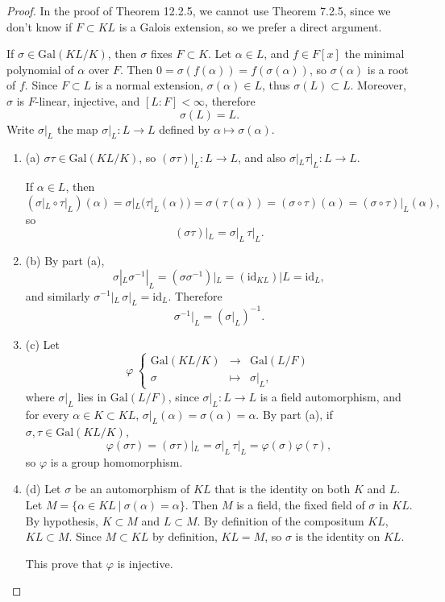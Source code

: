 \documentclass[11pt,a4paper]{article}
\newcommand{\be} {\begin{enumerate}}
\newcommand{\ee} {\end{enumerate}}
\newcommand{\Gal}{\mathrm{Gal}}
\begin{document}
\begin{proof}
In the proof of Theorem 12.2.5, we cannot use Theorem 7.2.5, since we don't know if $F \subset KL$ is a Galois extension, so we prefer a direct argument. 

If $\sigma \in \Gal(KL/K)$, then $\sigma$ fixes $F \subset K$. Let $\alpha \in L$, and $f \in F[x]$ the minimal polynomial of $\alpha$ over $F$. Then $0 = \sigma(f(\alpha)) = f(\sigma(\alpha))$, so $\sigma(\alpha)$ is a root of $f$. Since $F \subset L$ is a normal extension, $\sigma(\alpha) \in L$, thus $\sigma(L) \subset L$. Moreover, $\sigma$ is $F$-linear, injective, and $[L:F] < \infty$, therefore $$\sigma(L) = L.$$
Write $\sigma|_L $ the map $\sigma|_L : L \to L$ defined by $ \alpha \mapsto \sigma(\alpha)$.

\be
\item[(a)] $\sigma \tau \in \Gal(KL/K)$, so $(\sigma \tau)|_L : L \to L$, and also $\sigma|_L \tau|_L : L \to L$.

If $\alpha \in L$, then 
$$(\sigma|_L \circ \tau|_L)(\alpha) = \sigma|_L(\tau|_L(\alpha)) = \sigma(\tau(\alpha)) = (\sigma \circ \tau)(\alpha) =  (\sigma \circ \tau)|_L(\alpha),$$
so $$(\sigma \tau)|_L = \sigma|_L\, \tau|_L.$$

\item[(b)] By part (a), $$\sigma|_L \sigma^{-1}|_L = (\sigma \sigma^{-1})|_L = (\mathrm{id}_{KL})|L = \mathrm{id}_L,$$ and similarly $ \sigma^{-1}|_L\, \sigma|_L =  \mathrm{id}_L$. Therefore
$$\sigma^{-1}|_L = (\sigma|_L)^{-1}.$$

\item[(c)] Let
$$
\varphi\ 
\left\{
\begin{array}{ccc}
 \Gal(KL/K) & \to  & \Gal(L/F)   \\
  \sigma &\mapsto   &    \sigma|_L ,
\end{array}
\right.
$$
where $\sigma|_L$ lies in $\Gal(L/F)$, since $\sigma|_L : L \to L$ is a field automorphism, and for every $\alpha \in K \subset KL$, $\sigma|_L(\alpha) = \sigma(\alpha) = \alpha$.
By part (a), if $\sigma, \tau \in \Gal(KL/K)$,
$$\varphi(\sigma \tau) = (\sigma \tau)|_L = \sigma|_L\,  \tau|_L = \varphi(\sigma) \varphi(\tau),$$
so $\varphi$ is a group homomorphism.

\item[(d)]  Let $\sigma$ be an automorphism of $KL$ that is the identity on both $K$ and $L$.
Let $M = \{\alpha \in KL\ | \ \sigma(\alpha) = \alpha\}$. Then $M$ is a field, the fixed field of $\sigma$ in $KL$. By hypothesis,  $K \subset M$ and $L \subset M$. By definition of the compositum $KL$, $KL \subset M$. Since $M \subset KL$ by definition, $KL = M$, so $\sigma$ is the identity on $KL$.

This prove that $\varphi$ is injective.
\ee
\end{proof}
\end{document}
